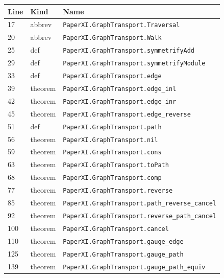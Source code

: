 \documentclass[10pt,oneside]{book}
\begin{document}
\begin{longtable}{@{}p{}p{}p{}@{}}\toprule Line&Kind&Name\\\midrule\endhead

17&abbrev&\nolinkurl{PaperXI.GraphTransport.Traversal}\\

20&abbrev&\nolinkurl{PaperXI.GraphTransport.Walk}\\

25&def&\nolinkurl{PaperXI.GraphTransport.symmetrifyAdd}\\

29&def&\nolinkurl{PaperXI.GraphTransport.symmetrifyModule}\\

33&def&\nolinkurl{PaperXI.GraphTransport.edge}\\

39&theorem&\nolinkurl{PaperXI.GraphTransport.edge_inl}\\

42&theorem&\nolinkurl{PaperXI.GraphTransport.edge_inr}\\

45&theorem&\nolinkurl{PaperXI.GraphTransport.edge_reverse}\\

51&def&\nolinkurl{PaperXI.GraphTransport.path}\\

56&theorem&\nolinkurl{PaperXI.GraphTransport.nil}\\

59&theorem&\nolinkurl{PaperXI.GraphTransport.cons}\\

63&theorem&\nolinkurl{PaperXI.GraphTransport.toPath}\\

68&theorem&\nolinkurl{PaperXI.GraphTransport.comp}\\

77&theorem&\nolinkurl{PaperXI.GraphTransport.reverse}\\

85&theorem&\nolinkurl{PaperXI.GraphTransport.path_reverse_cancel}\\

92&theorem&\nolinkurl{PaperXI.GraphTransport.reverse_path_cancel}\\

100&theorem&\nolinkurl{PaperXI.GraphTransport.cancel}\\

110&theorem&\nolinkurl{PaperXI.GraphTransport.gauge_edge}\\

125&theorem&\nolinkurl{PaperXI.GraphTransport.gauge_path}\\

139&theorem&\nolinkurl{PaperXI.GraphTransport.gauge_path_equiv}\\

\bottomrule\end{longtable}
\end{document}
